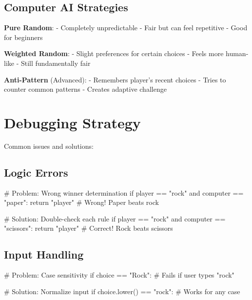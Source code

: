 \documentclass[
  letterpaper,
  DIV=11,
  numbers=noendperiod,
  oneside]{scrreprt}
\newenvironment{Shaded}{}{}
\newcommand{\CommentTok}[1]{\textcolor[rgb]{0.42,0.45,0.49}{#1}}
\newcommand{\ControlFlowTok}[1]{\textcolor[rgb]{0.84,0.23,0.29}{#1}}
\newcommand{\KeywordTok}[1]{\textcolor[rgb]{0.84,0.23,0.29}{#1}}
\newcommand{\NormalTok}[1]{\textcolor[rgb]{0.14,0.16,0.18}{#1}}
\newcommand{\OperatorTok}[1]{\textcolor[rgb]{0.14,0.16,0.18}{#1}}
\newcommand{\StringTok}[1]{\textcolor[rgb]{0.01,0.18,0.38}{#1}}
\begin{document}
\subsection{Computer AI Strategies}\label{computer-ai-strategies}

\textbf{Pure Random}: - Completely unpredictable - Fair but can feel
repetitive - Good for beginners

\textbf{Weighted Random}: - Slight preferences for certain choices -
Feels more human-like - Still fundamentally fair

\textbf{Anti-Pattern} (Advanced): - Remembers player's recent choices -
Tries to counter common patterns - Creates adaptive challenge

\section{Debugging Strategy}\label{debugging-strategy-3}

Common issues and solutions:

\subsection{Logic Errors}\label{logic-errors}

\begin{Shaded}
\begin{Highlighting}[]
\CommentTok{\# Problem: Wrong winner determination}
\ControlFlowTok{if}\NormalTok{ player }\OperatorTok{==} \StringTok{"rock"} \KeywordTok{and}\NormalTok{ computer }\OperatorTok{==} \StringTok{"paper"}\NormalTok{:}
    \ControlFlowTok{return} \StringTok{"player"}  \CommentTok{\# Wrong! Paper beats rock}

\CommentTok{\# Solution: Double{-}check each rule}
\ControlFlowTok{if}\NormalTok{ player }\OperatorTok{==} \StringTok{"rock"} \KeywordTok{and}\NormalTok{ computer }\OperatorTok{==} \StringTok{"scissors"}\NormalTok{:}
    \ControlFlowTok{return} \StringTok{"player"}  \CommentTok{\# Correct! Rock beats scissors}
\end{Highlighting}
\end{Shaded}

\subsection{Input Handling}\label{input-handling}

\begin{Shaded}
\begin{Highlighting}[]
\CommentTok{\# Problem: Case sensitivity}
\ControlFlowTok{if}\NormalTok{ choice }\OperatorTok{==} \StringTok{"Rock"}\NormalTok{:  }\CommentTok{\# Fails if user types "rock"}

\CommentTok{\# Solution: Normalize input}
\ControlFlowTok{if}\NormalTok{ choice.lower() }\OperatorTok{==} \StringTok{"rock"}\NormalTok{:  }\CommentTok{\# Works for any case}
\end{Highlighting}
\end{Shaded}
\end{document}
